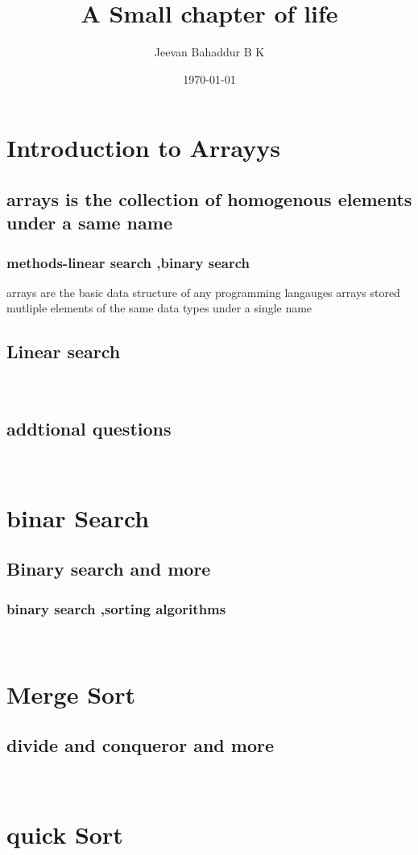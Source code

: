 \documentclass[12pt,a4paper]{report}
\title{A Small chapter of life}
\author{Jeevan Bahaddur B K}
\date{\today}
\begin{document}
\maketitle
\tableofcontents
\chapter{Introduction to Arrayys}
\section{arrays is the collection of homogenous elements under a same name}
\subsection{methods-linear search ,binary search}
arrays are the basic data structure of any programming langauges
arrays stored mutliple elements of the same data types under a single name
\lipsum[1]\\
\section{Linear search}
\lipsum[2]\\
\section{addtional questions}
\lipsum[1]\\
\chapter{binar Search}
\section{Binary search and more}
\subsection{binary search ,sorting algorithms}
\lipsum[1]\\
\chapter{Merge Sort}
\section{divide and conqueror and more}
\lipsum[1]\\
\chapter{quick Sort}
\end{document}
